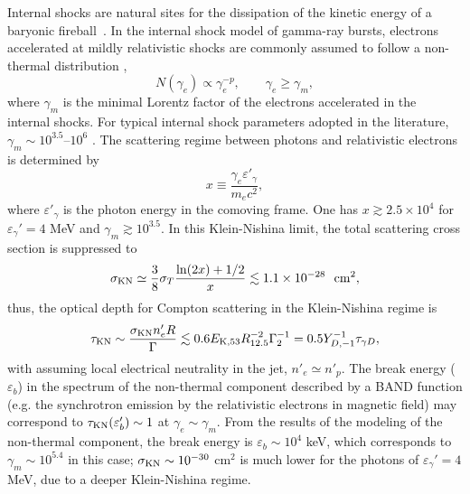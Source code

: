 \documentclass[prd,twocolumn,amsmath,amssymb,aps]{revtex4-2} %
\begin{document}
Internal shocks are natural sites for the dissipation of the kinetic energy of a baryonic fireball~\citep[][]{1990ApJ...365L..55S,1992MNRAS.258P..41R,1993ApJ...405..278M,1994ApJ...430L..93R}.
In the internal shock model of gamma-ray bursts, electrons accelerated at mildly relativistic shocks are commonly assumed to follow a non-thermal distribution \cite{2004RvMP...76.1143P},
\begin{equation}
N(\gamma_e) \propto \gamma_e^{-p}, \qquad \gamma_e \ge \gamma_m ,
\end{equation}
where $\gamma_m$ is the minimal Lorentz factor of the electrons accelerated in the internal shocks.
For typical internal shock parameters adopted in the literature, $\gamma_m \sim 10^{3.5}$--$10^6$ \cite{2013ApJ...769...69B,2019A&A...628A..59O}. The scattering regime between photons and relativistic electrons is determined by
\begin{equation}
x \equiv \frac{\gamma_e \varepsilon'_\gamma}{m_e c^2},
\end{equation}
where $\varepsilon'_\gamma$ is the photon energy in the comoving frame. One has $x \gtrsim 2.5\times 10^4$ for $\varepsilon_\gamma'=4$ MeV and $\gamma_m\gtrsim10^{3.5}$. In this Klein-Nishina limit, the total scattering cross section is suppressed to \cite{1986rpa..book.....R}
\begin{equation}
\sigma_{\rm KN} \simeq 
\frac{3}{8}\sigma_T
\frac{\ln(2x)+1/2}{x} 
\lesssim 1.1 \times 10^{-28}\ \ {\rm cm}^2,
\label{eq:sigmaKN-GBM}
\end{equation}
thus, the optical depth for Compton scattering in the Klein-Nishina regime is 
\begin{equation}
\tau_{\rm KN} \sim \frac{\sigma_{\rm KN} n'_e R}{\Gamma}
\lesssim 0.6 E_{\rm K, 53}R_{12.5}^{-2} \Gamma_2^{-1}=0.5Y_{D,-1}^{-1} \tau_{\gamma D},
\label{eq:sigmaKN-GBM}
\end{equation}
with assuming local electrical neutrality in the jet, $n'_{e}\simeq n'_p$. The break energy ($\varepsilon_b$) in the spectrum of the non-thermal component described by a BAND function (e.g. the synchrotron emission by the relativistic electrons in magnetic field) may correspond to $\tau_{\rm KN} (\varepsilon_b')\sim1$ at $\gamma_e\sim\gamma_m$. From the results of the modeling of the non-thermal component, the break energy is $\varepsilon_b\sim10^4$ keV, which corresponds to $\gamma_m\sim10^{5.4}$ in this case; $\sigma_{\rm KN}\sim10^{-30}$ cm$^{2}$ is much lower for the photons of $\varepsilon_\gamma'=4$ MeV, due to a deeper Klein-Nishina regime.
\end{document}

